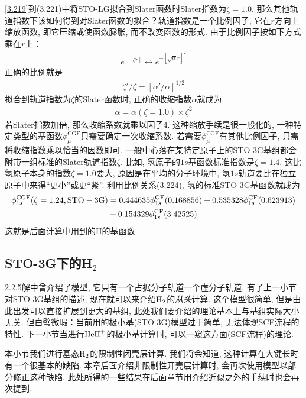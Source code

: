 \autoref{3.219}到(3.221)中将STO-LG拟合到Slater函数时Slater指数为$\zeta=1.0$. 
那么其他轨道指数下该如何得到对Slater函数的拟合？轨道指数是一个比例因子, 
它在$r$方向上缩放函数, 
即它压缩或使函数膨胀, 
而不改变函数的形式. 
由于比例因子按如下方式乘在$r$上：
\begin{align}
	e^{-[\zeta r]} \leftrightarrow e^{-[\sqrt{\alpha}r]^2}
\end{align}
正确的比例就是
\begin{align}
	\zeta'/\zeta=[\alpha'/\alpha]^{1/2}
\end{align}
拟合到轨道指数为$\zeta$的Slater函数时, 
正确的收缩指数$\alpha$就成为
\begin{align}
	\alpha = \alpha(\zeta=1.0)\times \zeta^2
\end{align}
若Slater指数加倍, 
那么收缩系数就乘以因子$4$. 
这种缩放手续是很一般化的, 
一种特定类型的基函数$\phi_\mu^\mathrm{CGF}$只需要确定一次收缩系数. 
若需要$\phi_\mu^\mathrm{CGF}$有其他比例因子, 
只需将收缩指数乘以恰当的因数即可. 
一般中心落在某特定原子上的STO-3G基组都会附带一组标准的Slater轨道指数$\zeta$. 
比如, 
氢原子的$1s$基函数标准指数是$\zeta=1.4$. 
这比氢原子本身的指数$\zeta=1.0$要大, 
原因是在平均的分子环境中, 
氢$1s$轨道要比在独立原子中来得``更小”或更``紧”. 
利用比例关系(3.224), 
氢的标准STO-3G基函数就成为
\begin{align}
	\label{3.225}
	\phi_{1s}^\mathrm{CGF}(\zeta=1.24,\mathrm{STO-3G}) & = 0.444635\phi_{1s}^\mathrm{GF}(0.168856) + 0.535328\phi_{1s}^\mathrm{GF}(0.623913) \notag\\
	& + 0.154329\phi_{1s}^\mathrm{GF}(3.42525)
\end{align}
这就是后面计算中用到的$\mathrm{H}$的基函数
\subsection{STO-3G下的H$_2$}
2.2.5解中曾介绍了模型, 它只有一个占据分子轨道一个虚分子轨道. 
有了上一小节对STO-3G基组的描述, 现在就可以来介绍$\mathrm{H}_2$的\emph{从头}\hft 计算. 
这个模型很简单, 但是由此出发可以直接扩展到更大的基组, 此处我们要介绍的\hft 理论基本上与基组实际大小无关. 
但白璧微瑕：当前用的极小基(STO-3G)模型过于简单, 无法体现SCF流程的特性. 
下一小节当进行$\mathrm{HeH}^+$的极小基计算时, 可以一窥这方面(SCF流程)的\hft 理论.

本小节我们进行基态$\mathrm{H}_2$的限制性闭壳层计算. 
我们将会知道, 
这种计算在大键长时有一个很基本的缺陷. 
本章后面介绍非限制性开壳层计算时, 
会再次使用模型以部分修正这种缺陷. 
此处所得的一些结果在后面章节用介绍\hft 近似之外的手续时也会再次提到.


